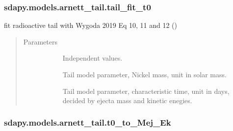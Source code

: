 \documentclass[letterpaper,10pt,english]{sphinxmanual}
\begin{document}
\subsubsection{sdapy.models.arnett\_tail.tail\_fit\_t0}
\label{\detokenize{generated/sdapy.models.arnett_tail.tail_fit_t0:sdapy-models-arnett-tail-tail-fit-t0}}\label{\detokenize{generated/sdapy.models.arnett_tail.tail_fit_t0::doc}}

\begin{fulllineitems}
\label{\detokenize{generated/sdapy.models.arnett_tail.tail_fit_t0:sdapy.models.arnett_tail.tail_fit_t0}}
fit radioactive tail with Wygoda 2019 Eq 10, 11 and 12
()
\begin{quote}\begin{description}
\item[{Parameters}] \leavevmode\begin{description}
\item[{}] \leavevmode{[}\sphinxtitleref{array}{]}
Independent values.

\item[{}] \leavevmode{[}\sphinxtitleref{float}{]}
Tail model parameter, Nickel mass, unit in solar mass.

\item[{}] \leavevmode{[}\sphinxtitleref{float}{]}
Tail model parameter, characteristic time, unit in days, decided by ejecta mass and kinetic enegies.

\end{description}

\end{description}\end{quote}

\end{fulllineitems}



\subsubsection{sdapy.models.arnett\_tail.t0\_to\_Mej\_Ek}
\label{\detokenize{generated/sdapy.models.arnett_tail.t0_to_Mej_Ek:sdapy-models-arnett-tail-t0-to-mej-ek}}\label{\detokenize{generated/sdapy.models.arnett_tail.t0_to_Mej_Ek::doc}}
\end{document}
